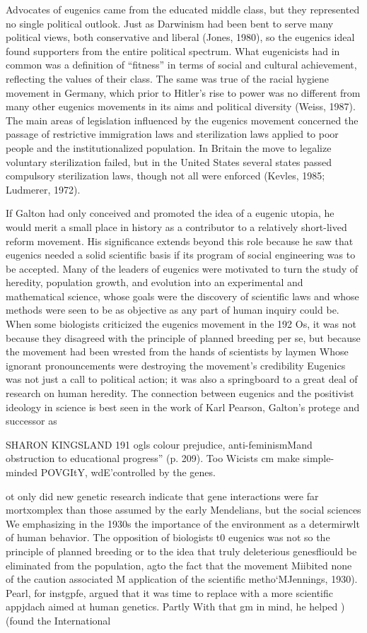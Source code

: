\documentclass[12pt]{letter}
\begin{document}
Advocates of eugenics came from the educated middle class, but they represented no single political outlook. Just as Darwinism had been bent to serve many political views, both conservative and liberal (Jones, 1980), so the eugenics ideal found supporters from the entire political spectrum. What eugenicists had in common was a definition of “fitness” in terms of social and cultural achievement, reflecting the values of their class. The same was true of the racial hygiene movement in Germany, which prior to Hitler’s rise to power was no different from many other eugenics movements in its aims and political diversity (Weiss, 1987). The main areas of legislation influenced by the eugenics movement concerned the passage of restrictive immigration laws and sterilization laws applied to poor people and the institutionalized population. In Britain the move to legalize voluntary sterilization failed, but in the United States several states passed compulsory sterilization laws, though not all were enforced (Kevles, 1985; Ludmerer, 1972).

If Galton had only conceived and promoted the idea of a eugenic utopia, he would merit a small place in history as a contributor to a relatively short-lived reform movement. His significance extends beyond this role because he saw that eugenics needed a solid scientific basis if its program of social engineering was to be accepted. Many of the leaders of eugenics were motivated to turn the study of heredity, population growth, and evolution into an experimental and mathematical science, whose goals were the discovery of scientific laws and whose methods were seen to be as objective as any part of human inquiry could be. When some biologists criticized the eugenics movement in the 192 Os, it was not because they disagreed with the principle of planned breeding per se, but because the movement had been wrested from the hands of scientists by laymen Whose ignorant pronouncements were destroying the movement’s credibility Eugenics was not just a call to political action; it was also a springboard to a great deal of research on human heredity.
The connection between eugenics and the positivist ideology in science is best seen in the work of Karl Pearson, Galton’s protege and successor as


SHARON KINGSLAND 191
ogls
colour prejudice, anti-feminismMand obstruction to educational progress” (p. 209). Too Wicists cm make simple-minded
POVGItY, wdE'controlled by the genes.

ot only did new genetic research indicate that gene interactions were far mortxomplex than those assumed by the early Mendelians, but the social sciences We emphasizing in the 1930s the importance of the environment as a determirwlt of human behavior. The opposition of biologists t0 eugenics was not so the principle of planned breeding or to the idea that truly deleterious genesfliould be eliminated from the population, agto the fact that the movement Miibited none of the caution associated M application of the scientific metho‘MJennings, 1930). Pearl, for instgpfe, argued that it was time to replace with a more scientific appjdach aimed at human genetics. Partly With that gm in mind, he helped )(found the International
\end{document}
